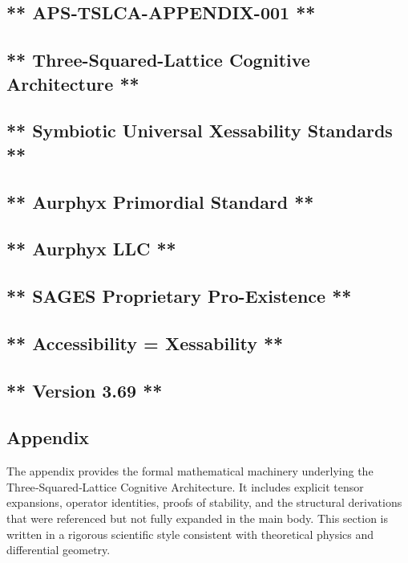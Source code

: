 \subsection{** APS‑TSLCA-APPENDIX-001 **}\label{apstslca-appendix-001}

\subsection{** Three-Squared-Lattice Cognitive Architecture **}\label{three-squared-lattice-cognitive-architecture}

\subsection{** Symbiotic Universal Xessability Standards **}\label{symbiotic-universal-xessability-standards}

\subsection{** Aurphyx Primordial Standard **}\label{aurphyx-primordial-standard}

\subsection{** Aurphyx LLC **}\label{aurphyx-llc}

\subsection{** SAGES \textbar{} Proprietary \textbar{} Pro-Existence **}\label{sages-proprietary-pro-existence}

\subsection{** Accessibility = Xessability **}\label{accessibility-xessability}

\subsection{** Version 3.69 **}\label{version-3.69}

\subsection{Appendix}\label{appendix}

The appendix provides the formal mathematical machinery underlying the Three‑Squared‑Lattice Cognitive Architecture. It includes explicit tensor expansions, operator identities, proofs of stability, and the structural derivations that were referenced but not fully expanded in the main body. This section is written in a rigorous scientific style consistent with theoretical physics and differential geometry.


